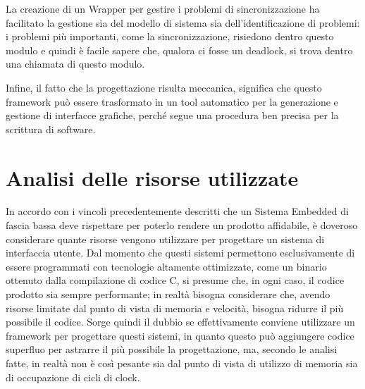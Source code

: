 \documentclass[journal]{IEEEtran}
\begin{document}
La creazione di un Wrapper per gestire i problemi di sincronizzazione ha facilitato la gestione sia del modello di sistema sia dell'identificazione di problemi: i problemi più importanti, come la sincronizzazione, risiedono dentro questo modulo e quindi è facile sapere che, qualora ci fosse un deadlock, si trova dentro una chiamata di questo modulo.

Infine, il fatto che la progettazione risulta meccanica, significa che questo framework può essere trasformato in un tool automatico per la generazione e gestione di interfacce grafiche, perché segue una procedura ben precisa per la scrittura di software.

\section{Analisi delle risorse utilizzate}

In accordo con i vincoli precedentemente descritti che un Sistema Embedded di fascia bassa deve rispettare per poterlo rendere un prodotto affidabile, è doveroso considerare quante risorse vengono utilizzare per progettare un sistema di interfaccia utente. Dal momento che questi sistemi permettono esclusivamente di essere programmati con tecnologie altamente ottimizzate, come un binario ottenuto dalla compilazione di codice C, si presume che, in ogni caso, il codice prodotto sia sempre performante; in realtà bisogna considerare che, avendo risorse limitate dal punto di vista di memoria e velocità, bisogna ridurre il più possibile il codice. Sorge quindi il dubbio se effettivamente conviene utilizzare un framework per progettare questi sistemi, in quanto questo può aggiungere codice superfluo per astrarre il più possibile la progettazione, ma, secondo le analisi fatte, in realtà non è così pesante sia dal punto di vista di utilizzo di memoria sia di occupazione di cicli di clock.
\end{document}
